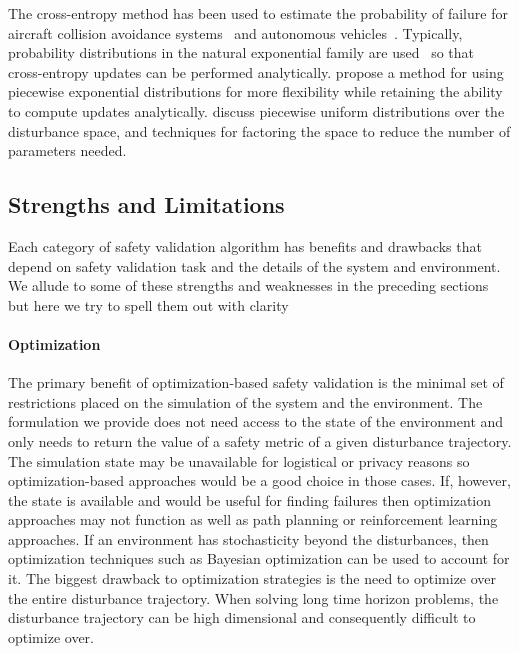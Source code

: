 The cross-entropy method has been used to estimate the probability of failure for aircraft collision avoidance systems~\cite{kim2016improving} and autonomous vehicles~\cite{okelly2018scalable,zhao2016accelerated,huang2017accelerated}. Typically, probability distributions in the natural exponential family are used~\cite{kim2016improving,okelly2018scalable,zhao2016accelerated} so that cross-entropy updates can be performed analytically. \textcite{huang2017accelerated} propose a method for using piecewise exponential distributions for more flexibility while retaining the ability to compute updates analytically. \textcite{sankaranarayanan2012falsification}  discuss piecewise uniform distributions over the disturbance space, and techniques for factoring the space to reduce the number of parameters needed.

\subsection{Strengths and Limitations}

Each category of safety validation algorithm has benefits and drawbacks that depend on safety validation task and the details of the system and environment. We allude to some of these strengths and weaknesses in the preceding sections but here we try to spell them out with clarity

\paragraph{Optimization} The primary benefit of optimization-based safety validation is the minimal set of restrictions placed on the simulation of the system and the environment. The formulation we provide does not need access to the state of the environment and only needs to return the value of a safety metric of a given disturbance trajectory. The simulation state may be unavailable for logistical or privacy reasons so optimization-based approaches would be a good choice in those cases. If, however, the state is available and would be useful for finding failures then optimization approaches may not function as well as path planning or reinforcement learning approaches. If an environment has stochasticity beyond the disturbances, then optimization techniques such as Bayesian optimization can be used to account for it. The biggest drawback to optimization strategies is the need to optimize over the entire disturbance trajectory. When solving long time horizon problems, the disturbance trajectory can be high dimensional and consequently difficult to optimize over. 



